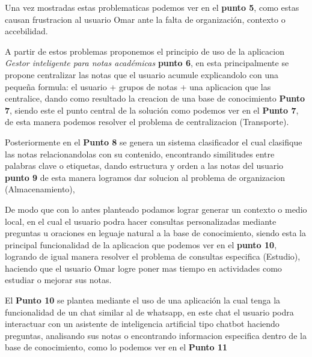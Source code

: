 \noindent Una vez mostradas estas problematicas podemos ver en el \textbf{punto 5}, como estas causan frustracion al usuario Omar ante la falta de organización, contexto o accebilidad. 

\vspace{.5cm}

A partir de estos problemas proponemos el principio de uso de la aplicacion \emph{Gestor inteligente para notas académicas} \textbf{punto 6}, en esta principalmente se propone centralizar las notas que el usuario acumule explicandolo con una pequeña formula: el usuario + grupos de notas + una aplicacion que las centralice, dando como resultado la creacion de una base de conocimiento \textbf{Punto 7}, siendo este el punto central de la solución como podemos ver en el \textbf{Punto 7}, de esta manera podemos resolver el problema de centralizacion (Transporte). 

\vspace{.5cm}

Posteriormente en el \textbf{Punto 8} se genera un sistema clasificador el cual clasifique las notas relacionandolas con su contenido, encontrando similitudes entre palabras clave o etiquetas, dando estructura y orden a las notas del usuario \textbf{punto 9} de esta manera logramos dar solucion al problema de organizacion (Almacenamiento), 

\vspace{.5cm}

De modo que con lo antes planteado podamos lograr generar un contexto o medio local, en el cual el usuario podra hacer consultas personalizadas mediante preguntas u oraciones en leguaje natural a la base de conocimiento, siendo esta la principal funcionalidad de la aplicacion que podemos ver en el \textbf{punto 10}, logrando de igual manera resolver el problema de consultas especifica (Estudio), haciendo que el usuario Omar logre poner mas tiempo en actividades como estudiar o mejorar sus notas. 

\vspace{.5cm}

El \textbf{Punto 10} se plantea mediante el uso de una aplicación la cual tenga la funcionalidad de un chat similar al de whatsapp, en este chat el usuario podra interactuar con un asistente de inteligencia artificial tipo chatbot haciendo preguntas, analisando sus notas o encontrando informacion especifica dentro de la base de conocimiento, como lo podemos ver en el \textbf{Punto 11} 

\vspace{.5cm}

